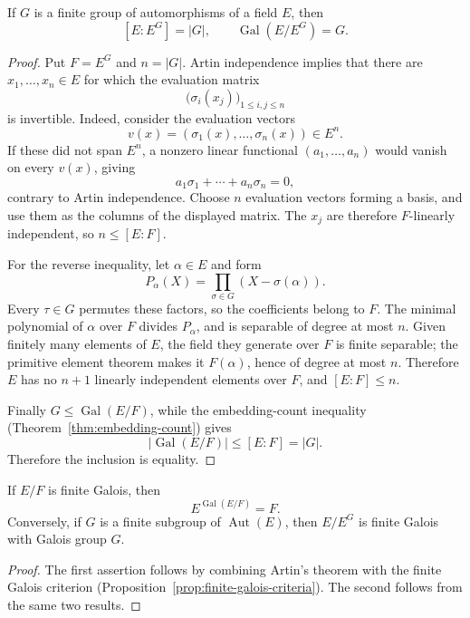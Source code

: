 \begin{theorem}\label{thm:artin-fixed-field}
If \(G\) is a finite group of automorphisms of a field \(E\), then
\[
[E:E^G]=|G|,
\qquad
\operatorname{Gal}(E/E^G)=G.
\]
\end{theorem}
\begin{proof}
Put \(F=E^G\) and \(n=|G|\).  Artin independence implies that there are
\(x_1,\ldots,x_n\in E\) for which the evaluation matrix
\[
\bigl(\sigma_i(x_j)\bigr)_{1\leq i,j\leq n}
\]
is invertible.  Indeed, consider the evaluation vectors
\[
v(x)=(\sigma_1(x),\ldots,\sigma_n(x))\in E^n.
\]
If these did not span \(E^n\), a nonzero linear functional
\((a_1,\ldots,a_n)\) would vanish on every \(v(x)\), giving
\[
a_1\sigma_1+\cdots+a_n\sigma_n=0,
\]
contrary to Artin independence.  Choose \(n\) evaluation vectors forming a
basis, and use them as the columns of the displayed matrix.  The \(x_j\) are
therefore \(F\)-linearly independent, so \(n\leq[E:F]\).

For the reverse inequality, let \(\alpha\in E\) and form
\[
P_\alpha(X)=\prod_{\sigma\in G}(X-\sigma(\alpha)).
\]
Every \(\tau\in G\) permutes these factors, so the coefficients belong to
\(F\).  The minimal polynomial of \(\alpha\) over \(F\) divides
\(P_\alpha\), and is separable of degree at most \(n\).  Given finitely many
elements of \(E\), the field they generate over \(F\) is finite separable;
the primitive element theorem makes it \(F(\alpha)\), hence of degree at most
\(n\).  Therefore \(E\) has no \(n+1\) linearly independent elements over
\(F\), and \([E:F]\leq n\).

Finally \(G\leq\operatorname{Gal}(E/F)\), while the embedding-count
inequality (Theorem~\ref{thm:embedding-count}) gives
\[
|\operatorname{Gal}(E/F)|\leq[E:F]=|G|.
\]
Therefore the inclusion is equality.
\end{proof}

\begin{corollary}\label{cor:finite-automorphism-consequences}
If \(E/F\) is finite Galois, then
\[
E^{\operatorname{Gal}(E/F)}=F.
\]
Conversely, if \(G\) is a finite subgroup of \(\operatorname{Aut}(E)\), then
\(E/E^G\) is finite Galois with Galois group \(G\).
\end{corollary}
\begin{proof}
The first assertion follows by combining Artin's theorem with the finite
Galois criterion (Proposition~\ref{prop:finite-galois-criteria}).  The second
follows from the same two results.
\end{proof}

